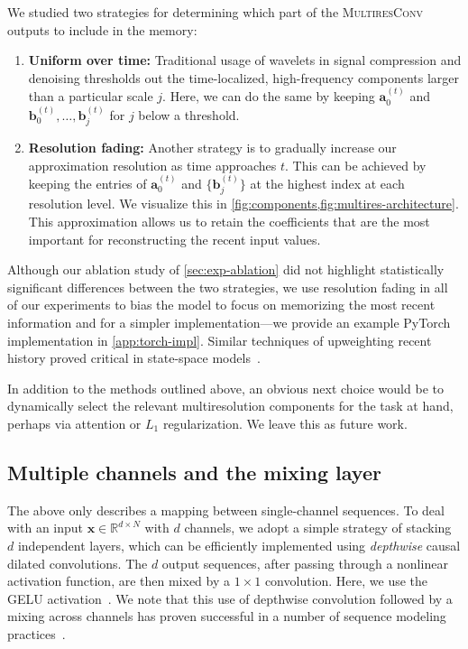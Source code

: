 \documentclass{article}
\newcommand{\reals}{\mathbb{R}}
\theoremstyle{plain}
\theoremstyle{definition}
\theoremstyle{remark}
\begin{document}
We studied two strategies for determining which part of the \textsc{MultiresConv} outputs to include in the memory:
\begin{enumerate}[(1)]
    \item \textbf{Uniform over time:} Traditional usage of wavelets in signal compression and denoising thresholds out the time-localized, high-frequency components larger than a particular scale $j$. 
    Here, we can do the same by keeping $\mathbf a^{(t)}_0$ and $\mathbf b^{(t)}_{0}, \ldots, \mathbf b^{(t)}_j$ for $j$ below a threshold. 
    \item \textbf{Resolution fading:} Another strategy is to gradually increase our approximation resolution as time approaches $t$. 
    This can be achieved by keeping the entries of $\mathbf a^{(t)}_0$ and $\{\mathbf b^{(t)}_{j}\}$ at the highest index at each resolution level. We visualize this in \cref{fig:components,fig:multires-architecture}.
    This approximation allows us to retain the coefficients that are the most important for reconstructing the recent input values.
\end{enumerate}
Although our ablation study of \cref{sec:exp-ablation} did not highlight statistically significant differences between the two strategies, 
we use resolution fading in all of our experiments to bias the model to focus on memorizing the most recent information and for a simpler implementation---we provide an example PyTorch implementation in \cref{app:torch-impl}.
Similar techniques of upweighting recent history proved critical in state-space models~\citep{gu2020hippo,gu2021efficiently}.

In addition to the methods outlined above, an obvious next choice would be to dynamically select the relevant multiresolution components for the task at hand, perhaps via attention or $L_1$ regularization.  We leave this as future work.

\subsection{Multiple channels and the mixing layer}

The above only describes a mapping between single-channel sequences. 
To deal with an input $\mathbf x \in \reals^{d\times N}$ with $d$ channels, we adopt a simple strategy of stacking $d$ independent layers, which can be efficiently implemented using \emph{depthwise} causal dilated convolutions. 
The $d$ output sequences, after passing through a nonlinear activation function, 
are then mixed by a $1\times 1$ convolution. 
Here, we use the GELU activation~\citep{hendrycks2016gaussian}.
We note that this use of depthwise convolution followed by a mixing across channels has proven successful in a number of sequence modeling practices~\citep{wu2018pay,gu2021efficiently}.  
\end{document}
